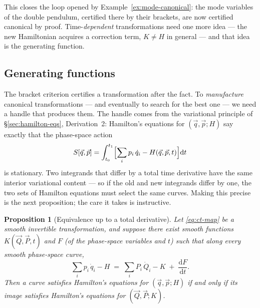 \documentclass[11pt]{article}
\theoremstyle{plain}
\newtheorem{proposition}[theorem]{Proposition}
\theoremstyle{definition}
\theoremstyle{remark}
\newcommand{\dd}{\mathrm{d}}
\newcommand{\tot}[2]{\frac{\dd #1}{\dd #2}}
\newcommand{\vq}{\vec{q}}
\newcommand{\vp}{\vec{p}}
\newcommand{\vQ}{\vec{Q}}
\newcommand{\vP}{\vec{P}}
\begin{document}
This closes the loop opened by Example~\ref{ex:mode-canonical}: the mode
variables of the double pendulum, certified there by their brackets,
are now certified canonical by proof. Time-\emph{dependent}
transformations need one more idea --- the new Hamiltonian acquires a
correction term, $K \ne H$ in general --- and that idea is the
generating function.

\subsection{Generating functions}
\label{sec:hj-gen}

The bracket criterion certifies a transformation after the fact. To
\emph{manufacture} canonical transformations --- and eventually to
search for the best one --- we need a handle that produces them. The
handle comes from the variational principle of \S\ref{sec:hamilton-eqs},
Derivation~2: Hamilton's equations for $(\vq, \vp; H)$ say exactly that
the phase-space action
\begin{equation}
  S[\vq, \vp] = \int_{t_0}^{t_1}
  \Bigl[\sum_i p_i\,\dot q_i - H(\vq, \vp, t)\Bigr]\dd t
  \label{eq:ps-action-recall}
\end{equation}
is stationary. Two integrands that differ by a total time derivative
have the same interior variational content --- so if the old and new
integrands differ by one, the two sets of Hamilton equations must
select the same curves. Making this precise is the next proposition;
the care it takes is instructive.

\begin{proposition}[Equivalence up to a total derivative]
\label{prop:total-derivative}
Let \eqref{eq:ct-map} be a smooth invertible transformation, and
suppose there exist smooth functions $K(\vQ,\vP,t)$ and $F$ (of the
phase-space variables and $t$) such that along \emph{every} smooth
phase-space curve,
\begin{equation}
  \sum_i p_i\,\dot q_i - H
  \;=\;
  \sum_i P_i\,\dot Q_i - K
  \;+\; \tot{F}{t} .
  \label{eq:one-form-identity}
\end{equation}
Then a curve satisfies Hamilton's equations for $(\vq, \vp; H)$ if and
only if its image satisfies Hamilton's equations for $(\vQ, \vP; K)$.
\end{proposition}
\end{document}
